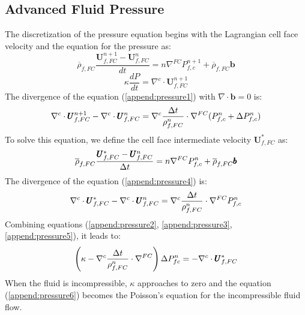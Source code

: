 \documentclass[preprint,12pt]{elsarticle}
\begin{document}
\subsection{\textsf{Advanced Fluid Pressure}}
The discretization of the pressure equation begins with the Lagrangian cell face velocity and the equation for the pressure as:
%
\begin{equation}
 \label{append:pressure1}
  \overline{\rho}_{f,FC} \frac{\pmb{U}_{f,FC}^{n+1} - \pmb{U}_{f,FC}^{n}}{dt} 
  = n \nabla^{FC} P_{f,c}^{n+1} + \overline{\rho}_{f,FC} \pmb{b}
\end {equation}
%
%
\begin{equation}
\label{append:pressure2}
  \kappa \frac{dP}{dt} = \nabla^c \cdot \pmb{U}_{f,FC}^{n+1}
\end {equation}
%
The divergence of the equation (\ref{append:pressure1}) with $ \nabla \cdot \pmb{b} = 0$ is:
%
\begin{equation}
\label{append:pressure3}
  \nabla^c \cdot \pmb{U}_{f,FC}^{n+1} - \nabla^c \cdot \pmb{U}_{f,FC}^{n}
  = \nabla^c \frac{\Delta{t}}{\rho_{f,FC}^n} \cdot \nabla^{FC} (P_{f,c}^{n} + \Delta P_{f,c}^{n})
\end {equation}
%
To solve this equation, we define the cell face intermediate velocity $ \pmb{U}_{f,FC}^{*}$ as:
%
\begin{equation}
 \label{append:pressure4}
  \overline{\rho}_{f,FC} \frac{\pmb{U}_{f,FC}^{*} - \pmb{U}_{f,FC}^{n}}{\Delta{t}} 
  = n \nabla^{FC} P_{f,c}^{n} + \overline{\rho}_{f,FC} \pmb{b}
\end {equation}
%
%
The divergence of the equation (\ref{append:pressure4}) is:
%
\begin{equation}
\label{append:pressure5}
  \nabla^c \cdot \pmb{U}_{f,FC}^{*} - \nabla^c \cdot \pmb{U}_{f,FC}^{n}
  = \nabla^c \frac{\Delta{t}}{\rho_{f,FC}^n} \cdot \nabla^{FC} P_{f,c}^{n}
\end {equation}
%
Combining equations (\ref{append:pressure2}, \ref{append:pressure3}, \ref{append:pressure5}), it leads to:
\begin{equation}
\label{append:pressure6}
  \left(  
   \kappa - \nabla^c \frac{\Delta{t}}{\rho_{f,FC}^n} \cdot \nabla^{FC}
  \right) \Delta P_{fc}^{n} = - \nabla^c \cdot \pmb{U}_{f,FC}^{*}
\end {equation}
When the fluid is incompressible, $\kappa$ approaches to zero and the equation (\ref{append:pressure6}) becomes the Poisson's equation for the incompressible fluid flow.
%
%
\end{document}
